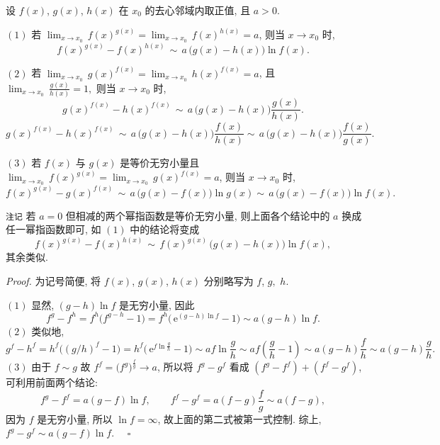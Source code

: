 


\begin{theorem}{}
设 $f(x)$, $g(x)$, $h(x)$ 在 $x_{0}$ 的去心邻域内取正值,
且 $a>0$. 

$(1)$ 若 ${\displaystyle \lim_{x\to x_{0}}}\,f(x)^{g(x)}={\displaystyle \lim_{x\to x_{0}}}\,f(x)^{h(x)}=a$,
则当 $x\to x_{0}$ 时, 
$$
f(x)^{g(x)}-f(x)^{h(x)}\,\sim\,a\,\big(g(x)-h(x)\big)\ln f(x).~
$$
 

$(2)$ 若 ${\displaystyle {\displaystyle \lim_{x\to x_{0}}}\,}g(x)^{f(x)}={\displaystyle \lim_{x\to x_{0}}}\,h(x)^{f(x)}=a$,
且 ${\displaystyle \lim_{x\to x_{0}}}\,{\displaystyle \frac{g(x)}{h(x)}}=1,$
则当 $x\to x_{0}$ 时, 
\[
g(x)^{f(x)}-h(x)^{f(x)}\,\sim\,a\,\big(g(x)-h(x)\big)\frac{g(x)}{h(x)}.~
\]
\begin{equation}
g(x)^{f(x)}-h(x)^{f(x)}\,\sim\,a\,\big(g(x)-h(x)\big)\frac{f(x)}{h(x)}\sim\,a\,\big(g(x)-h(x)\big)\frac{f(x)}{g(x)}.~
\end{equation}

$(3)$ 若 $f(x)$ 与 $g(x)$ 是等价无穷小量且 ${\displaystyle {\displaystyle \lim_{x\to x_{0}}}\,}f(x)^{g(x)}={\displaystyle \lim_{x\to x_{0}}}\,g(x)^{f(x)}=a$,
则当 $x\to x_{0}$ 时, 
\[
f(x)^{g(x)}-g(x)^{f(x)}\,\sim\,a\,\big(g(x)-f(x)\big)\ln g(x)\sim\,a\,\big(g(x)-f(x)\big)\ln f(x).~
\]

\verb`注记`
若 $a=0$ 但相减的两个幂指函数是等价无穷小量, 则上面各个结论中的 $a$ 换成任一幂指函数即可, 如 $(1)$ 中的结论将变成
\[
f(x)^{g(x)}-f(x)^{h(x)}\,\sim\,f(x)^{g(x)}\,\big(g(x)-h(x)\big)\ln f(x),~
\]
其余类似. 

\end{theorem}


\textsl{Proof.} 为记号简便, 将 $f(x)$, $g(x)$, $h(x)$ 分别略写为 $f$, $g,$ $h$. 

$(1)$ 显然, $(g-h)\ln f$ 是无穷小量, 因此
\[
f^{g}-f^{h}=f^{h}\big(f^{g-h}-1\big)=f^{h}\big(\,\mathrm{e}^{(g-h)\ln f}-1\big)\sim a(g-h)\ln f.~
\]
 $(2)$ 类似地, 
\[
g^{f}-h^{f}=h^{f}\big((g/h)^{f}-1\big)=h^{f}\big(\,\mathrm{e}^{f\ln\frac{g}{h}}-1\big)\sim af\ln\frac{g}{h}\sim af\left(\frac{g}{h}-1\right)\sim a(g-h)\frac{f}{h}\sim a(g-h)\frac{g}{h}.~
\]
 $(3)$ 由于 $f\sim g$ 故 $f^{f}=\big(f^{g}\big)^{\frac{f}{g}}\to a$,
所以将 $f^{g}-g^{f}$ 看成 $(f^{g}-f^{f})+(f^{f}-g^{f})$, 可利用前面两个结论: 
\[
f^{g}-f^{f}=a(g-f)\ln f,\qquad f^{f}-g^{f}=a(f-g)\frac{f}{g}\sim a(f-g),~
\]
因为 $f$ 是无穷小量, 所以 $\ln f=\infty$, 故上面的第二式被第一式控制. 综上, $f^{g}-g^{f}\sim a(g-f)\ln f.$ $\quad\square$

